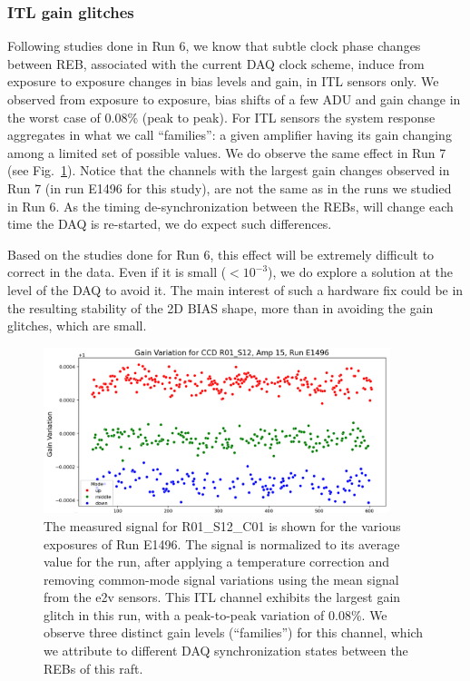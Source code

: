 \subsubsection{ITL gain glitches} 
Following studies done in Run 6, we know that subtle clock phase changes between REB, associated with the current DAQ clock scheme, induce from exposure to exposure changes in bias levels and gain, in ITL sensors only.  We observed from exposure to exposure, bias shifts of a few ADU and gain change in the worst case of 0.08\% (peak to peak). For ITL sensors the system response aggregates in what we call ``families'': a given amplifier having its gain changing among a limited set of possible values. We do observe the same effect in Run 7 (see Fig.~\ref{fig:ITLGglitch}). Notice that the channels with the largest gain changes observed in Run 7 (in run E1496 for this study), are  not the same as in the runs we studied in Run 6. As the timing de-synchronization between the REBs, will change each time the DAQ is re-started, we do expect such differences.

Based on the studies done for Run 6, this effect will be extremely difficult to correct in the data. Even if it is small ($<10^{-3}$), we do explore a solution at the level of the DAQ to avoid it. The main interest of such a hardware fix could be in the resulting  stability of the 2D BIAS shape, more than in avoiding the gain glitches, which are small. 

\begin{figure}[ht]
\begin{centering}
\includegraphics[width=0.9\textwidth]{figures/Gain_variation_R01_S12_amp15_E1496.png}
\end{centering}
\caption{The measured signal for R01\_S12\_C01 is shown for the various exposures of Run E1496. The signal is normalized to its average value for the run, after applying a temperature correction and removing common-mode signal variations using the mean signal from the e2v sensors. This ITL channel exhibits the largest gain glitch in this run, with a peak-to-peak variation of 0.08\%. We observe three distinct gain levels (``families'') for this channel, which we attribute to different DAQ synchronization states between the REBs of this raft.}
\label{fig:ITLGglitch}
\end{figure}

